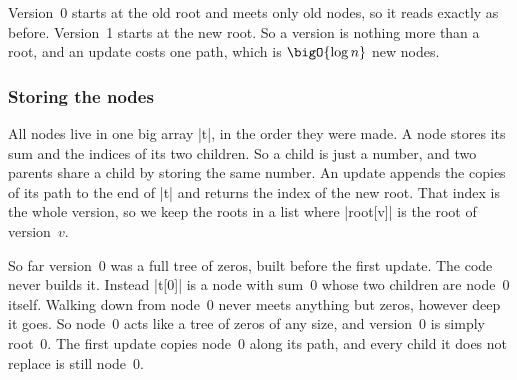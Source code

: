 Version~0 starts at the old root and meets only old nodes, so it reads exactly as before. Version~1 starts at the new root. So a version is nothing more than a root, and an update costs one path, which is \(\bigO{\log n}\) new nodes.

\subsubsection{Storing the nodes}
All nodes live in one big array \code|t|, in the order they were made. A node stores its sum and the indices of its two children. So a child is just a number, and two parents share a child by storing the same number. An update appends the copies of its path to the end of \code|t| and returns the index of the new root. That index is the whole version, so we keep the roots in a list where \code|root[v]| is the root of version~\(v\).

So far version~0 was a full tree of zeros, built before the first update. The code never builds it. Instead \code|t[0]| is a node with sum~0 whose two children are node~0 itself. Walking down from node~0 never meets anything but zeros, however deep it goes. So node~0 acts like a tree of zeros of any size, and version~0 is simply root~0. The first update copies node~0 along its path, and every child it does not replace is still node~0.

